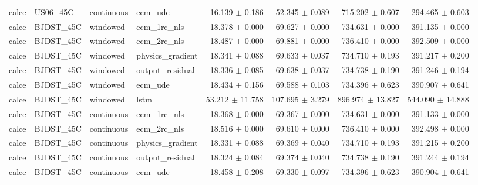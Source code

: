 \begin{longtable}{llllrrrr}
calce & US06\_45C & continuous & ecm\_ude & 16.139 $\pm$ 0.186 & 52.345 $\pm$ 0.089 & 715.202 $\pm$ 0.607 & 294.465 $\pm$ 0.603 \\
calce & BJDST\_45C & windowed & ecm\_1rc\_nls & 18.378 $\pm$ 0.000 & 69.627 $\pm$ 0.000 & 734.631 $\pm$ 0.000 & 391.135 $\pm$ 0.000 \\
calce & BJDST\_45C & windowed & ecm\_2rc\_nls & 18.487 $\pm$ 0.000 & 69.881 $\pm$ 0.000 & 736.410 $\pm$ 0.000 & 392.509 $\pm$ 0.000 \\
calce & BJDST\_45C & windowed & physics\_gradient & 18.341 $\pm$ 0.088 & 69.633 $\pm$ 0.037 & 734.710 $\pm$ 0.193 & 391.217 $\pm$ 0.200 \\
calce & BJDST\_45C & windowed & output\_residual & 18.336 $\pm$ 0.085 & 69.638 $\pm$ 0.037 & 734.738 $\pm$ 0.190 & 391.246 $\pm$ 0.194 \\
calce & BJDST\_45C & windowed & ecm\_ude & 18.434 $\pm$ 0.156 & 69.588 $\pm$ 0.103 & 734.396 $\pm$ 0.623 & 390.907 $\pm$ 0.641 \\
calce & BJDST\_45C & windowed & lstm & 53.212 $\pm$ 11.758 & 107.695 $\pm$ 3.279 & 896.974 $\pm$ 13.827 & 544.090 $\pm$ 14.888 \\
calce & BJDST\_45C & continuous & ecm\_1rc\_nls & 18.368 $\pm$ 0.000 & 69.367 $\pm$ 0.000 & 734.631 $\pm$ 0.000 & 391.133 $\pm$ 0.000 \\
calce & BJDST\_45C & continuous & ecm\_2rc\_nls & 18.516 $\pm$ 0.000 & 69.610 $\pm$ 0.000 & 736.410 $\pm$ 0.000 & 392.498 $\pm$ 0.000 \\
calce & BJDST\_45C & continuous & physics\_gradient & 18.331 $\pm$ 0.088 & 69.369 $\pm$ 0.040 & 734.710 $\pm$ 0.193 & 391.215 $\pm$ 0.200 \\
calce & BJDST\_45C & continuous & output\_residual & 18.324 $\pm$ 0.084 & 69.374 $\pm$ 0.040 & 734.738 $\pm$ 0.190 & 391.244 $\pm$ 0.194 \\
calce & BJDST\_45C & continuous & ecm\_ude & 18.458 $\pm$ 0.208 & 69.330 $\pm$ 0.097 & 734.396 $\pm$ 0.623 & 390.904 $\pm$ 0.641 \\
\end{longtable}
